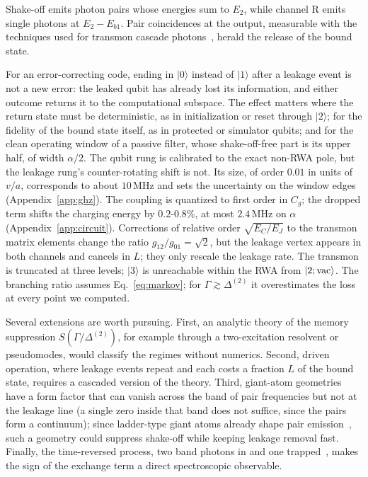 \documentclass[aps,prresearch,twocolumn,superscriptaddress,nofootinbib,longbibliography,floatfix]{revtex4-2}
\begin{document}
Shake-off emits photon pairs whose energies sum to $E_2$, while channel R emits single photons at
$E_2-E_{b1}$. Pair coincidences at the output, measurable with the techniques used for transmon cascade
photons~\cite{Gasparinetti2017}, herald the release of the bound state.

For an error-correcting code, ending in $|0\rangle$ instead of $|1\rangle$ after a leakage event
is not a new error: the leaked qubit has already lost its information, and either outcome returns it to the
computational subspace. The effect matters where the return state must be deterministic, as in initialization or reset
through $|2\rangle$; for the fidelity of the bound state itself, as in protected or simulator qubits; and for the clean
operating window of a passive filter, whose shake-off-free part is its upper half, of width $\alpha/2$.
The qubit rung is calibrated to the exact non-RWA pole, but the leakage rung's counter-rotating
shift is not. Its size, of order $0.01$ in units of $v/a$, corresponds to about $10$\,MHz and sets the uncertainty on
the window edges (Appendix~\ref{app:ghz}). The coupling is quantized to first order in $C_g$; the dropped term shifts the
charging energy by $0.2$-$0.8\%$, at most $2.4$\,MHz on $\alpha$ (Appendix~\ref{app:circuit}). Corrections of relative
order $\sqrt{E_C/E_J}$ to the transmon matrix elements change the ratio $g_{12}/g_{01}=\sqrt2$, but the leakage
vertex appears in both channels and cancels in $L$; they only rescale the leakage rate. The transmon is truncated at
three levels; $|3\rangle$ is unreachable within the RWA from $|2;{\rm vac}\rangle$. The branching ratio assumes
Eq.~\eqref{eq:markov}; for $\Gamma\gtrsim\Delta^{(2)}$ it overestimates the loss at every point we computed.

Several extensions are worth pursuing. First, an analytic theory of the memory suppression $S(\Gamma/\Delta^{(2)})$,
for example through a two-excitation resolvent or pseudomodes, would classify the regimes without numerics. Second,
driven operation, where leakage events repeat and each costs a fraction $L$ of the bound state, requires a cascaded
version of the theory. Third, giant-atom geometries~\cite{Kockum2014,Kannan2020} have a form factor that can vanish across
the band of pair frequencies but not at the leakage line (a single zero inside that band does not suffice, since the
pairs form a continuum); since ladder-type giant atoms already shape pair
emission~\cite{Gao2024,Rieck2025}, such a geometry could suppress shake-off while keeping leakage removal fast.
Finally, the time-reversed process, two band photons in and one trapped~\cite{Longo2010,Calajo2016,Calajo2019,Trivedi2021,Gu2024},
makes the sign of the exchange term a direct spectroscopic observable.
\end{document}
